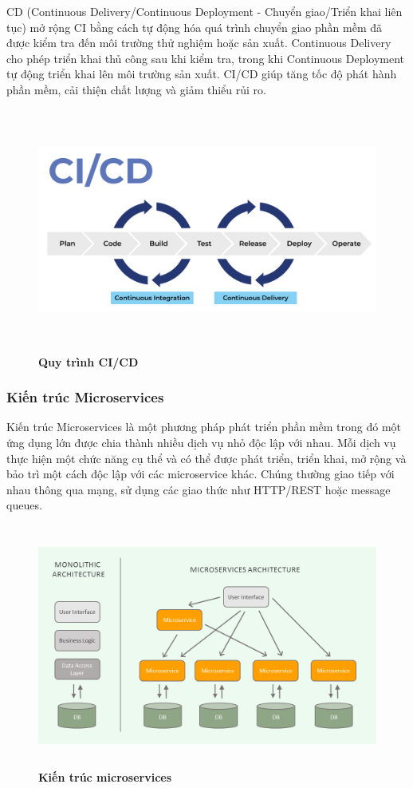 CD (Continuous Delivery/Continuous Deployment - Chuyển giao/Triển khai liên tục) mở rộng CI bằng cách tự động hóa quá trình chuyển giao phần mềm đã được kiểm tra đến môi trường thử nghiệm hoặc sản xuất. Continuous Delivery cho phép triển khai thủ công sau khi kiểm tra, trong khi Continuous Deployment tự động triển khai lên môi trường sản xuất. CI/CD giúp tăng tốc độ phát hành phần mềm, cải thiện chất lượng và giảm thiểu rủi ro.
\begin{figure}[H]
	\centering
	\includegraphics[width=15cm,height=8cm]{Images/Technology/cicd.png}
	\caption[Quy trình CI/CD]{\bfseries \fontsize{12pt}{0pt}
		\selectfont Quy trình CI/CD}
	\label{cicd} %
\end{figure}

\subsubsection{Kiến trúc Microservices}
Kiến trúc Microservices là một phương pháp phát triển phần mềm trong đó một
ứng dụng lớn được chia thành nhiều dịch vụ nhỏ độc lập với nhau.  Mỗi dịch vụ thực hiện một chức năng cụ thể và có thể được phát triển, triển khai, mở rộng và bảo trì một cách độc lập với các microservice khác. Chúng thường giao tiếp với nhau thông qua mạng, sử dụng các giao thức như HTTP/REST hoặc message queues.

\begin{figure}[H]
	\centering
	\includegraphics[width=15cm,height=8cm]{Images/Technology/microservice.png}
	\caption[Kiến trúc microservices]{\bfseries \fontsize{12pt}{0pt}
		\selectfont Kiến trúc microservices}
	\label{microservice} %
\end{figure}

